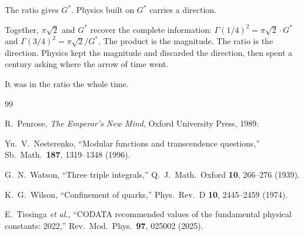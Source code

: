\documentclass[12pt,reqno]{amsart}
\theoremstyle{definition}
\theoremstyle{remark}
\newcommand{\Gstar}{G^{\!*}}
\begin{document}
The ratio gives $\Gstar$. Physics built on $\Gstar$ carries a direction.

Together, $\pi\sqrt{2}$ and $\Gstar$ recover the complete information: $\Gamma(1/4)^2 = \pi\sqrt{2}\cdot\Gstar$ and $\Gamma(3/4)^2 = \pi\sqrt{2}/\Gstar$. The product is the magnitude. The ratio is the direction. Physics kept the magnitude and discarded the direction, then spent a century asking where the arrow of time went.

It was in the ratio the whole time.

\begin{thebibliography}{99}

R.~Penrose,
\emph{The Emperor's New Mind},
Oxford University Press, 1989.

Yu.~V.~Nesterenko,
``Modular functions and transcendence questions,''
Sb.~Math.\ \textbf{187}, 1319--1348 (1996).

G.~N.~Watson,
``Three triple integrals,''
Q.~J.~Math.~Oxford \textbf{10}, 266--276 (1939).

K.~G.~Wilson,
``Confinement of quarks,''
Phys.~Rev.~D \textbf{10}, 2445--2459 (1974).

E.~Tiesinga \emph{et al.},
``CODATA recommended values of the fundamental physical constants: 2022,''
Rev.~Mod.~Phys.\ \textbf{97}, 025002 (2025).


\end{thebibliography}
\end{document}
